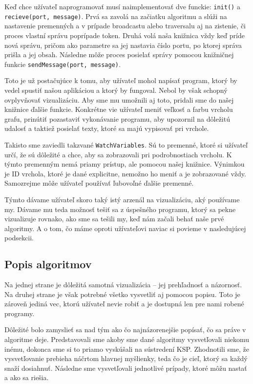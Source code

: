 Keď chce užívateľ naprogramovať musí naimplementovať dve funckie: \verb!init()! a
\verb!recieve(port, message)!. Prvá sa zavolá na začiatku algoritmu a slúži na nastavenie premenných
a v prípade broadcastu alebo traversalu aj na zistenie, či proces vlastní správu poprípade token.
Druhá volá naša knižnica vždy keď príde nová správu, pričom ako parametre sa jej nastavia číslo
portu, po ktorej správa prišla a jej obsah. Následne môže proces posielať správy pomocou knižničnej
funkcie \verb!sendMessage(port, message)!.

Toto je už postačujúce k tomu, aby užívateľ mohol napísať program, ktorý by vedel spustiť našou
aplikáciou a ktorý by fungoval. Nebol by však schopný ovplyvňovať vizualizáciu. Aby sme mu umožnili
aj toto, pridali sme do našej knižnice ďalšie funkcie. Konkrétne vie užívateľ meniť veľkosť a farbu
vrcholu grafu, prinútiť pozastaviť vykonávanie programu, aby upozornil na dôležitú udalosť a
taktiež posielať texty, ktoré sa majú vypisovať pri vrchole.

Takisto sme zaviedli takzvané \verb!WatchVariables!. Sú to premenné, ktoré si užívateľ určí, že sú
dôležité a chce, aby sa zobrazovali pri podrobnostiach vrcholu. K týmto premenným nemá priamy
prístup, ale pomocou našej knižnice. Výnimkou je ID vrchola, ktoré je dané explicitne, nemožno ho
meniť a je zobrazované vždy. Samozrejme môže užívateľ používať ľubovoľné ďalšie premenné.

Týmto dávame užívateľ skoro taký istý arzenál na vizualizáciu, aký používame my. Dávame mu teda
možnosť tešiť sa z úspešného programu, ktorý sa pekne vizualizuje rovnako, ako sme sa tešili my, keď
nám začali behať naše prvé algoritmy. A o tom, čo máme oproti užívateľovi naviac si povieme v
nasledujúcej podsekcii.

\subsection{Popis algoritmov}

Na jednej strane je dôležitá samotná vizualizácia -- jej prehľadnosť a názornosť. Na druhej strane
je však potrebné všetko vysvetliť aj pomocou popisu. Toto je zároveň jediná vec, ktorú užívateľ
nevie robiť a je dostupná len pre nami robené programy.

Dôležité bolo zamyslieť sa nad tým ako čo najnázorenejšie popísať, čo sa práve v algoritme deje.
Predstavovali sme akoby sme dané algoritmy vysvetľovali niekomu inému, dokonca sme si to priamo
vyskúšali na sústredení KSP. Zhodnotili sme, že vysvetľovanie prebieha náčrtom hlavnej myšlienky,
teda čo je cieľ, ktorý sa každý snaží dosiahnuť. Následne sme vysvetľovali jednotlivé prípady, ktoré
môžu nastať a ako sa riešia.

